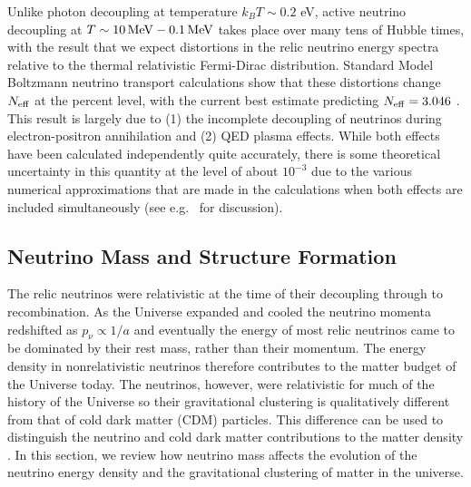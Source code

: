 Unlike photon decoupling at temperature $k_B T \sim 0.2$ eV, active neutrino decoupling at $T \sim 10 \, {\rm MeV} - 0.1 \, {\rm MeV}$ takes place over many tens of Hubble times, with the result that we expect distortions in the relic neutrino energy spectra relative to the thermal relativistic Fermi-Dirac distribution. Standard Model Boltzmann neutrino transport calculations show that these distortions change $N_{\rm eff}$ at the percent level, with the current best estimate predicting $N_{\rm eff} = 3.046$ \cite{Mangano:2005cc}.   This result is largely due to (1) the incomplete decoupling of neutrinos during electron-positron annihilation and (2) QED plasma effects.  While both effects have been calculated independently quite accurately, there is some theoretical uncertainty in this quantity at the level of about $10^{-3}$ due to the various numerical approximations that are made in the calculations when both effects are included simultaneously (see e.g.~\cite{Grohs:2015tfy} for discussion).  



\subsection{Neutrino Mass and Structure Formation}
\label{ssec:numasstheoryreview}

The relic neutrinos were relativistic at the time of their decoupling through to recombination.  As the Universe expanded and cooled the neutrino momenta redshifted as $p_\nu\propto 1/a$ and eventually the energy of most relic neutrinos came to be dominated by their rest mass, rather than their momentum. The energy density in nonrelativistic neutrinos therefore contributes to the matter budget of the Universe today. The neutrinos, however, were relativistic for much of the history of the Universe so their gravitational clustering is qualitatively different from that of cold dark matter (CDM) particles. This difference can be used to distinguish the neutrino and cold dark matter contributions to the matter density \cite{Hu:1997mj, Lesgourgues:2006nd, Abazajian:2011dt}.  In this section, we review how neutrino mass affects the evolution of the neutrino energy density and the gravitational clustering of matter in the universe. 
 
